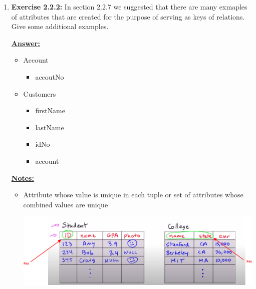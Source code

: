 \documentclass[12pt]{article}
\begin{document}
\begin{enumerate}[1.]
    \item \textbf{Exercise 2.2.2:} In section 2.2.7 we suggested that there are many
    exmaples of attributes that are created for the purpose of serving as keys of
    relations. Give some additional examples.

    \bigskip

    \begin{mdframed}
        \underline{\textbf{Answer:}}

        \bigskip

        \begin{itemize}
            \item Account
            \begin{itemize}
                \item accoutNo
            \end{itemize}

            \item Customers
            \begin{itemize}
                \item firstName
                \item lastName
                \item idNo
                \item account
            \end{itemize}

        \end{itemize}
    \end{mdframed}


    \underline{\textbf{Notes:}}

    \begin{itemize}
        \item Attribute whose value is unique in each tuple or set of attributes
        whose combined values are unique

        \begin{center}
        \includegraphics[width=\linewidth]{images/worksheet_1_solution_4.png}
        \end{center}
    \end{itemize}


\end{enumerate}
\end{document}
